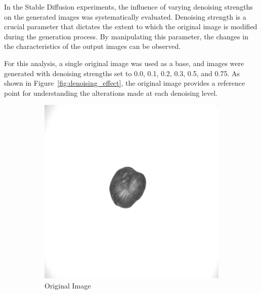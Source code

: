\documentclass[12pt,DIV14,BCOR12mm,a4paper,footinclude=false,headinclude,parskip=half-,twoside,openright,cleardoublepage=empty,toc=index,bibliography=totoc,listof=totoc]{scrreprt}
\numberwithin{equation}{chapter}
\begin{document}
In the Stable Diffusion experiments, the influence of varying denoising strengths on the generated images was systematically evaluated. Denoising strength is a crucial parameter that dictates the extent to which the original image is modified during the generation process. By manipulating this parameter, the changes in the characteristics of the output images can be observed.

For this analysis, a single original image was used as a base, and images were generated with denoising strengths set to 0.0, 0.1, 0.2, 0.3, 0.5, and 0.75. As shown in Figure~\ref{fig:denoising_effect}, the original image provides a reference point for understanding the alterations made at each denoising level.
\begin{figure}
    \centering
    \begin{subfigure}[t]{0.23\textwidth} %
        \centering
        \includegraphics[width=\linewidth]{../media/image_original.png} %
        \caption{Original Image}
    \end{subfigure}
    \begin{subfigure}[t]{0.23\textwidth} %
        \centering

\end{subfigure}
\end{figure}
\end{document}
